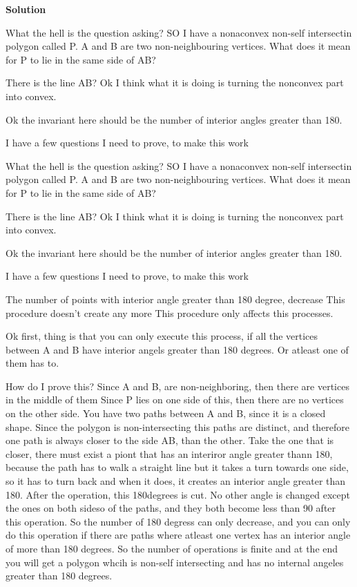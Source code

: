 \documentclass[12pt,tikz,border=10pt]{article}
\theoremstyle{definition}
\theoremstyle{remark}
\begin{document}
\textbf{Solution}

What the hell is the question asking?  SO I have a nonaconvex non-self intersectin polygon
called P. A and B are two non-neighbouring vertices. What does it mean for P to lie in the same side of AB?

There is the line AB? Ok I think what it is doing is turning the nonconvex part into convex.

Ok the invariant here should be the number of interior angles greater than 180. 

I have a few questions I need to prove, to make this work


What the hell is the question asking?  SO I have a nonaconvex non-self intersectin polygon
called P. A and B are two non-neighbouring vertices. What does it mean for P to lie in the same side of AB?

There is the line AB? Ok I think what it is doing is turning the nonconvex part into convex.

Ok the invariant here should be the number of interior angles greater than 180. 

I have a few questions I need to prove, to make this work

The number of points with interior angle greater than 180 degree, decrease
This procedure doesn't create any more 
This procedure only affects this processes.

Ok first, thing is that you can only execute this process, if all the vertices between 
A and B have interior angels greater than 180 degrees. Or atleast one of them has to.

How do I prove this? Since A and B, are non-neighboring, then there are vertices in the middle of them
Since P lies on one side of this, then there are no vertices on the other side.
You have two paths between A and B, since it is a closed shape. Since the 
polygon is non-intersecting this paths are distinct, and therefore one path is always closer to the side
AB, than the other. Take the one that is closer, there must exist a piont that has 
an interiror angle greater thann 180, because the path has to walk a straight line but 
it takes a turn towards one side, so it has to turn back and when it does, it creates an interior angle 
greater than 180.
 After the operation, this 180degrees is cut. No other angle is changed except the ones 
 on both sideso of the paths, and they both become less than 90 after this operation.
 So the number of 180 degress can only decrease, and you can only do this operation if there 
 are paths where atleast one vertex has an interior angle of more than 180 degrees. So 
 the number of operations is finite and at the end you will get a polygon whcih is non-self intersecting and
 has no internal angeles greater than 180 degrees.
\end{document}

